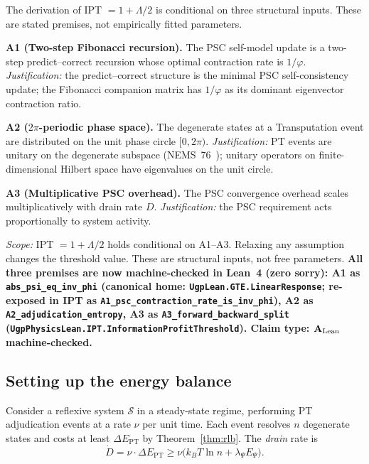 \documentclass[11pt,twocolumn]{article}
\newcommand{\CatAL}{\ensuremath{\textbf{A}_{\rm Lean}}}
\theoremstyle{remark}
\begin{document}
\begin{tcolorbox}[title=\textbf{Structural Assumptions (A1--A3)},fonttitle=\bfseries\small]
\small
The derivation of IPT $= 1 + \Lambda/2$ is conditional on three structural inputs.
These are stated premises, not empirically fitted parameters.

\noindent\textbf{A1 (Two-step Fibonacci recursion).} The PSC self-model update is a two-step predict--correct recursion whose optimal contraction rate is $1/\varphi$. \textit{Justification:} the predict--correct structure is the minimal PSC self-consistency update; the Fibonacci companion matrix has $1/\varphi$ as its dominant eigenvector contraction ratio.

\noindent\textbf{A2 ($2\pi$-periodic phase space).} The degenerate states at a Transputation event are distributed on the unit phase circle $[0,2\pi)$. \textit{Justification:} PT events are unitary on the degenerate subspace (NEMS~76~\cite{SpivackNEMS76}); unitary operators on finite-dimensional Hilbert space have eigenvalues on the unit circle.

\noindent\textbf{A3 (Multiplicative PSC overhead).} The PSC convergence overhead scales multiplicatively with drain rate $D$. \textit{Justification:} the PSC requirement acts proportionally to system activity.

\smallskip
\noindent\textit{Scope:} IPT $= 1 + \Lambda/2$ holds conditional on A1--A3. Relaxing any assumption changes the threshold value. These are structural inputs, not free parameters. \textbf{All three premises are now machine-checked in Lean~4 (zero sorry): A1 as \texttt{abs\_psi\_eq\_inv\_phi} (canonical home: \texttt{UgpLean.GTE.LinearResponse}; re-exposed in IPT as \texttt{A1\_psc\_contraction\_rate\_is\_inv\_phi}), A2 as \texttt{A2\_adjudication\_entropy}, A3 as \texttt{A3\_forward\_backward\_split} (\texttt{UgpPhysicsLean.\allowbreak{}IPT.\allowbreak{}InformationProfitThreshold}). Claim type: $\CatAL$ machine-checked.}
\end{tcolorbox}

\subsection{Setting up the energy balance}
\label{sec:deriv:setup}

Consider a reflexive system $\mathcal{S}$ in a steady-state regime,
performing PT adjudication events at a rate $\nu$ per unit time. Each
event resolves $n$ degenerate states and costs at least $\Delta
E_{\mathrm{PT}}$ by Theorem~\ref{thm:rlb}. The \emph{drain} rate is
\[
  \dot{D} = \nu \cdot \Delta E_{\mathrm{PT}}
            \geq \nu \bigl(k_B T \ln n + \lambda_\Psi E_\Psi\bigr).
\]
\end{document}
